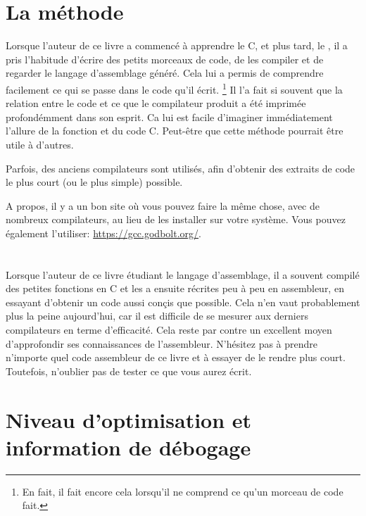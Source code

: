 \section{La méthode}

Lorsque l'auteur de ce livre a commencé à apprendre le C, et plus tard, le \Cpp, il a pris l'habitude d'écrire des petits morceaux de
code, de les compiler et de regarder le langage d'assemblage généré.
Cela lui a permis de comprendre facilement ce qui se passe dans le code qu'il écrit.
\footnote{En fait, il fait encore cela lorsqu'il ne comprend ce qu'un morceau de code fait.}
Il l'a fait si souvent que la relation entre le code \Cpp et ce que le compilateur produit a été imprimée profondémment dans son
 esprit.
Ca lui est facile d'imaginer immédiatement l'allure de la fonction et du code C.
Peut-être que cette méthode pourrait être utile à d'autres.


Parfois, des anciens compilateurs sont utilisés, afin d'obtenir des extraits de code le plus court (ou le plus simple) possible.

A propos, il y a un bon site où vous pouvez faire la même chose, avec de nombreux
compilateurs, au lieu de les installer sur votre système.
Vous pouvez également l'utiliser: \url{https://gcc.godbolt.org/}.

\section*{\Exercises}

Lorsque l'auteur de ce livre étudiant le langage d'assemblage, il a souvent compilé des petites fonctions en C et les a ensuite
récrites peu à peu en assembleur, en essayant d'obtenir un code aussi conçis que possible.
Cela n'en vaut probablement plus la peine aujourd'hui, car il est difficile
de se mesurer aux derniers compilateurs en terme d'efficacité. Cela reste par contre un excellent moyen d'approfondir ses connaissances
de l'assembleur.
N'hésitez pas à prendre n'importe quel code assembleur de ce livre et à essayer de le rendre plus court.
Toutefois, n'oublier pas de tester ce que vous aurez écrit.

\section*{Niveau d'optimisation et information de débogage}

